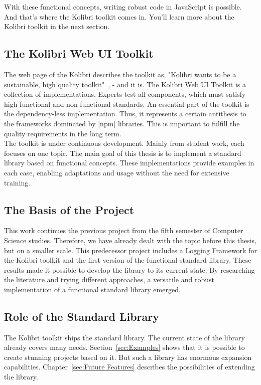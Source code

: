 With these functional concepts, writing robust code in JavaScript is possible. 
And that’s where the Kolibri toolkit comes in. You’ll learn more about the
Kolibri toolkit in the next section.

\subsection{The Kolibri Web UI Toolkit}
\label{sub:The Kolibri Web UI Toolkit}
The web page of the Kolibri describes the toolkit as, "Kolibri wants to be a
sustainable, high quality toolkit"~\cite{kolibri}, - and it is.
The Kolibri Web UI Toolkit is a collection of implementations. Experts test all
components, which must satisfy high functional and non-functional standards. An
essential part of the toolkit is the dependency-less implementation. Thus, it
represents a certain antithesis to the frameworks dominated by |npm| libraries.
This is important to fulfill the quality requirements in the long term.\\
The toolkit is under continuous development. Mainly from student work, each
focuses on one topic. The main goal of this thesis is to implement a standard
library based on functional concepts. These implementations provide examples in
each case, enabling adaptations and usage without the need for extensive
training.

\subsection{The Basis of the Project}
\label{sub:The Basis of the Project}
This work continues the previous project from the fifth semester of Computer
Science studies. Therefore, we have already dealt with the topic before this thesis,
but on a smaller scale. This predecessor project includes a Logging Framework
for the Kolibri toolkit and the first version of the functional standard
library. These results made it possible to develop the library to its current
state. By researching the literature and trying different approaches, a
versatile and robust implementation of a functional standard library emerged.

\subsection{Role of the Standard Library}
\label{sub:Role of the Standard Library}
The Kolibri toolkit ships the standard library. The current state of the
library already covers many needs. Section~\ref{sec:Examples} shows that it is
possible to create stunning projects based on it. But such a library has
enormous expansion capabilities. Chapter~\ref{sec:Future Features} describes
the possibilities of extending the library.

